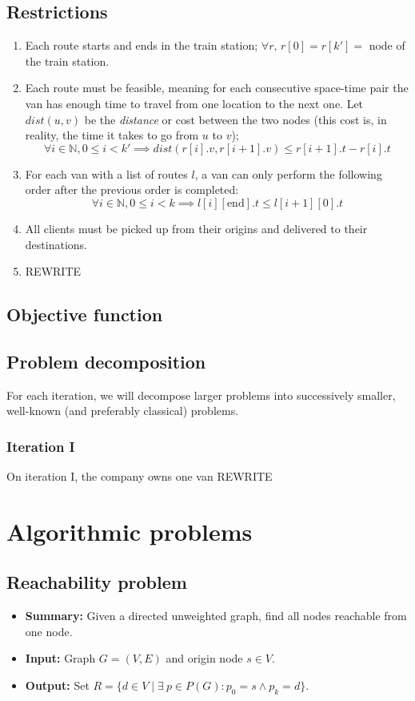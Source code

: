 \documentclass{report}[a4paper]
\theoremstyle{remark}
\begin{document}
\section{Restrictions}
\begin{enumerate}
    \item Each route starts and ends in the train station; $\forall r,\,r[0]=r[k']=$ node of the train station.
    \item Each route must be feasible, meaning for each consecutive space-time pair the van has enough time to travel from one location to the next one. Let $dist(u, v)$ be the \emph{distance} or cost between the two nodes (this cost is, in reality, the time it takes to go from $u$ to $v$);
    \begin{equation*}
        \forall i \in \mathbb{N}, 0 \leq i < k' \implies dist(r[i].v, r[i+1].v) \leq r[i+1].t-r[i].t
    \end{equation*}
    \item For each van with a list of routes $l$, a van can only perform the following order after the previous order is completed:
    \begin{equation*}
        \forall i \in \mathbb{N}, 0 \leq i < k \implies l[i][\text{end}].t \leq l[i+1][0].t
    \end{equation*}
    \item All clients must be picked up from their origins and delivered to their destinations.
    \item REWRITE
\end{enumerate}
\section{Objective function}
\section{Problem decomposition}
For each iteration, we will decompose larger problems into successively smaller, well-known (and preferably classical) problems.
\subsection{Iteration I}
On iteration I, the company owns one van REWRITE
\chapter{Algorithmic problems}
\section{Reachability problem}
\begin{itemize}
    \item \textbf{Summary:} Given a directed unweighted graph, find all nodes reachable from one node.
    \item \textbf{Input:} Graph $G=(V,E)$ and origin node $s \in V$.
    \item \textbf{Output:} Set $R=\{d \in V \mid \exists~p \in P(G)\colon p_0 = s \wedge p_k = d\}$.
\end{itemize}
\end{document}
